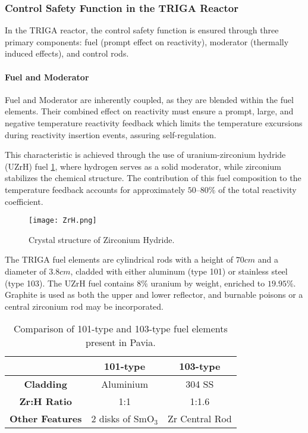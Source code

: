 \subsubsection{Control Safety Function in the TRIGA Reactor}

In the TRIGA reactor, the control safety function is ensured through three primary components: fuel (prompt effect on reactivity), moderator (thermally induced effects), and control rods.

\paragraph{Fuel and Moderator} Fuel and Moderator are inherently coupled, as they are blended within the fuel elements. Their combined effect on reactivity must ensure a prompt, large, and negative temperature reactivity feedback which limits the temperature excursions during reactivity insertion events, assuring self-regulation.

This characteristic is achieved through the use of uranium-zirconium hydride (UZrH) fuel \ref{fig:UZrH}, where hydrogen serves as a solid moderator, while zirconium stabilizes the chemical structure. The contribution of this fuel composition to the temperature feedback accounts for approximately $50–80\%$ of the total reactivity coefficient.

\begin{figure}[H]
    \centering
    \texttt{[image: ZrH.png]} %
    \caption{Crystal structure of Zirconium Hydride.}
    \label{fig:UZrH}
\end{figure}

The TRIGA fuel elements are cylindrical rods with a height of $70 cm$ and a diameter of $3.8 cm$, cladded with either aluminum (type 101) or stainless steel (type 103). The UZrH fuel contains $8\%$ uranium by weight, enriched to $19.95\%$. Graphite is used as both the upper and lower reflector, and burnable poisons or a central zirconium rod may be incorporated.

\begin{table}[H]
    \centering
    \renewcommand{\arraystretch}{1.5} %
    \setlength{\tabcolsep}{10pt} %
    \begin{tabular}{|c|c|c|}
        \hline
        \textbf{} & \textbf{101-type} & \textbf{103-type} \\
        \hline
        \textbf{Cladding} & {Aluminium} & {304 SS} \\
        \hline
        \textbf{Zr:H Ratio} & {1:1} & {1:1.6} \\
        \hline
        \textbf{Other Features} & {2 disks of SmO$_3$} & {Zr Central Rod} \\
        \hline
    \end{tabular}
    \caption{Comparison of 101-type and 103-type fuel elements present in Pavia.}
    \label{tab:fuel_types}
\end{table}

